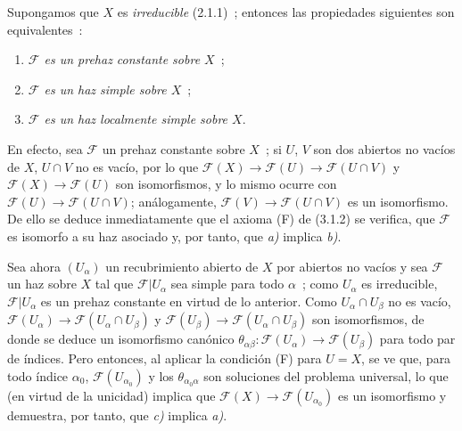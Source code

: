 \begin{env}[3.6.2]
\label{0.3.6.2-fr}
Supongamos que $X$ es \emph{irreducible} (2.1.1)~; entonces las propiedades
siguientes son equivalentes~:
\begin{enumerate}
  \item[a)] \emph{$\mathcal{F}$ es un prehaz constante sobre $X$}~;
  \item[b)] \emph{$\mathcal{F}$ es un haz simple sobre $X$}~;
  \item[c)] \emph{$\mathcal{F}$ es un haz localmente simple sobre $X$}.
\end{enumerate}

En efecto, sea $\mathcal{F}$ un prehaz constante sobre $X$~; si $U$, $V$
son dos abiertos no vacíos de $X$, $U\cap V$ no es vacío, por lo que
$\mathcal{F}(X)\to\mathcal{F}(U)\to\mathcal{F}(U\cap V)$ y
$\mathcal{F}(X)\to\mathcal{F}(U)$ son isomorfismos, y lo mismo ocurre
con $\mathcal{F}(U)\to\mathcal{F}(U\cap V)$; análogamente,
$\mathcal{F}(V)\to\mathcal{F}(U\cap V)$ es un isomorfismo. De ello se deduce
inmediatamente que el axioma (F) de (3.1.2) se verifica, que $\mathcal{F}$ es
isomorfo a su haz asociado y, por tanto, que \emph{a)} implica \emph{b)}.

Sea ahora $(U_\alpha)$ un recubrimiento abierto de $X$ por abiertos
no vacíos y sea $\mathcal{F}$ un haz sobre $X$ tal que
$\mathcal{F}|U_\alpha$ sea simple para todo $\alpha$~; como $U_\alpha$ es
irreducible, $\mathcal{F}|U_\alpha$ es un prehaz constante en virtud de
lo anterior. Como $U_\alpha\cap U_\beta$ no es vacío,
$\mathcal{F}(U_\alpha)\to\mathcal{F}(U_\alpha\cap U_\beta)$ y
$\mathcal{F}(U_\beta)\to\mathcal{F}(U_\alpha\cap U_\beta)$ son
isomorfismos, de donde se deduce un isomorfismo canónico
$\theta_{\alpha\beta}:\mathcal{F}(U_\alpha)\to\mathcal{F}(U_\beta)$ para todo
par de índices. Pero entonces, al aplicar la condición (F) para $U=X$,
se ve que, para todo índice $\alpha_0$, $\mathcal{F}(U_{\alpha_0})$ y los
$\theta_{\alpha_0\alpha}$ son soluciones del problema universal, lo que (en
virtud de la unicidad) implica que
$\mathcal{F}(X)\to\mathcal{F}(U_{\alpha_0})$ es un isomorfismo y demuestra,
por tanto, que \emph{c)} implica \emph{a)}.
\end{env}
